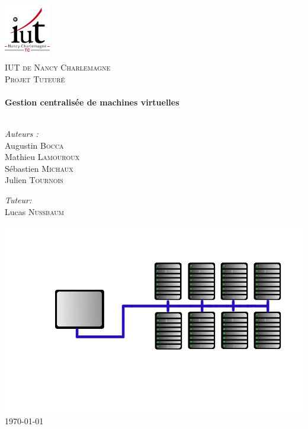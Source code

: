 \begin{titlepage}

\begin{center}


\includegraphics[width=0.15\textwidth]{images/logo_iut.png}\\[1cm]    

\textsc{\LARGE IUT de Nancy Charlemagne}\\[1.5cm]

\textsc{\Larg Projet Tuteuré}\\[0.5cm]


\HRule \\[0.4cm]
{ \huge \bfseries Gestion centralisée de machines virtuelles}\\[0.4cm]

\HRule \\[1.5cm]

\begin{minipage}{0.4\textwidth}
\begin{flushleft} \large
\emph{Auteurs :}\\
Augustin \textsc{Bocca}\\
Mathieu \textsc{Lamouroux}\\
Sébastien \textsc{Michaux}\\
Julien \textsc{Tournois}
\end{flushleft}
\end{minipage}
\begin{minipage}{0.4\textwidth}
\begin{flushright} \large
\emph{Tuteur:} \\
Lucas \textsc{Nussbaum}
\end{flushright}
\end{minipage}

\vfill
\includegraphics[width=450pt]{images/gestion_centralisee.png}\\    
{\large \today}

\end{center}

\end{titlepage}
